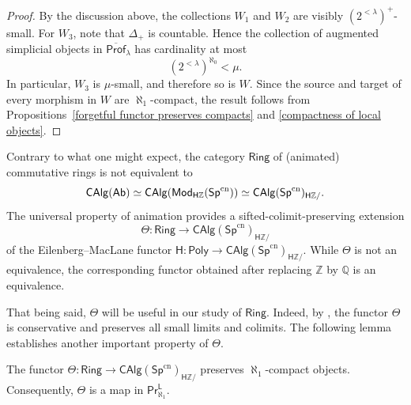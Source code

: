\begin{proof}
By the discussion above, the collections $W_1$ and $W_2$ are visibly $(2^{<\lambda})^+$-small. For $W_3$, note that $\Delta_+$ is countable. Hence the collection of augmented simplicial objects in $\overline{\mathsf{Prof}}_\lambda$ has cardinality at most
\[(2^{<\lambda})^{\aleph_0}<\mu.\]
In particular, $W_3$ is $\mu$-small, and therefore so is $W$. Since the source and target of every morphism in $W$ are $\aleph_1$-compact, the result follows from Propositions~\ref{forgetful functor preserves compacts} and \ref{compactness of local objects}.
\end{proof}

Contrary to what one might expect, the category $\mathsf{Ring}$ of (animated) commutative rings is not equivalent to
\[\mathsf{CAlg}(\mathsf{Ab})\simeq \mathsf{CAlg}\mleft(\mathsf{Mod}_{\mathsf{H}\mathbb{Z}}(\mathsf{Sp}^{\mathrm{cn}})\mright)\simeq\mathsf{CAlg}(\mathsf{Sp}^{\mathrm{cn}})_{\mathsf{H}\mathbb{Z}/}.\]
The universal property of animation \cite[Prop.~5.5.8.15]{lurie2009HTT} provides a sifted-colimit-preserving extension
\[\Theta\colon \mathsf{Ring}\to\mathsf{CAlg}(\mathsf{Sp}^{\mathrm{cn}})_{\mathsf{H}\mathbb{Z}/}\]
of the Eilenberg--MacLane functor $\mathsf{H}\colon \mathsf{Poly}\to\mathsf{CAlg}(\mathsf{Sp}^{\mathrm{cn}})_{\mathsf{H}\mathbb{Z}/}$. While $\Theta$ is not an equivalence, the corresponding functor obtained after replacing $\mathbb{Z}$ by $\mathbb{Q}$ is an equivalence.

That being said, $\Theta$ will be useful in our study of $\mathsf{Ring}$. Indeed, by \cite[Prop.~25.1.2.2]{lurie2018spectral}, the functor $\Theta$ is conservative and preserves all small limits and colimits. The following lemma establishes another important property of $\Theta$.

\begin{lemma}\label{Theta preserves kappa-compact objects}
    The functor $\Theta\colon \mathsf{Ring}\to \mathsf{CAlg}(\mathsf{Sp}^\mathrm{cn})_{\mathsf{H}\mathbb{Z}/}$ preserves $\aleph_1$-compact objects. Consequently, $\Theta$ is a map in $\mathsf{Pr}^\mathsf{L}_{\aleph_1}$.
\end{lemma}


